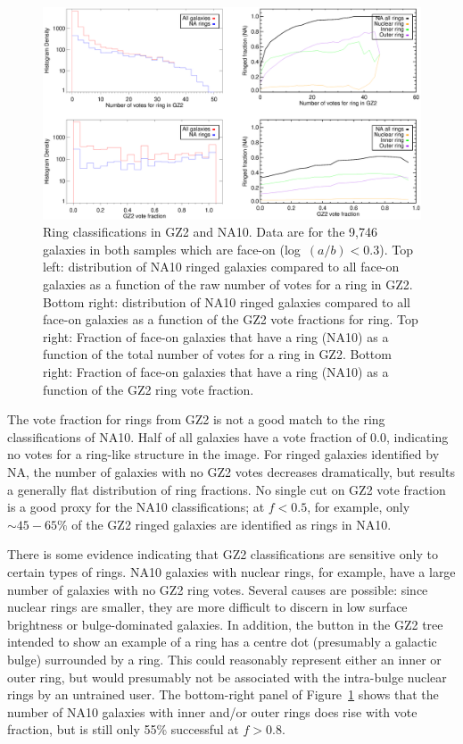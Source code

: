 \documentclass[useAMS,usenatbib]{mn2e}
\begin{document}
\begin{figure}
\includegraphics[angle=0,width=7.0in]{figures/na_rings_axial.eps}
\caption{Ring classifications in GZ2 and NA10. Data are for the 9,746 galaxies in both samples which are face-on (log~$(a/b)<0.3$). Top left: distribution of NA10 ringed galaxies compared to all face-on galaxies as a function of the raw number of votes for a ring in GZ2. Bottom right: distribution of NA10 ringed galaxies compared to all face-on galaxies as a function of the GZ2 vote fractions for ring. Top right: Fraction of face-on galaxies that have a ring (NA10) as a function of the total number of votes for a ring in GZ2. Bottom right: Fraction of face-on galaxies that have a ring (NA10) as a function of the GZ2 ring vote fraction. 
\label{fig-na_rings}}
\end{figure}

The vote fraction for rings from GZ2 is not a good match to the ring classifications of NA10. Half of all galaxies have a vote fraction of 0.0, indicating no votes for a ring-like structure in the image. For ringed galaxies identified by NA, the number of galaxies with no GZ2 votes decreases dramatically, but results a generally flat distribution of ring fractions. No single cut on GZ2 vote fraction is a good proxy for the NA10 classifications; at $f<0.5$, for example, only $\sim45-65\%$ of the GZ2 ringed galaxies are identified as rings in NA10.  

There is some evidence indicating that GZ2 classifications are sensitive only to certain types of rings. NA10 galaxies with nuclear rings, for example, have a large number of galaxies with no GZ2 ring votes. Several causes are possible: since nuclear rings are smaller, they are more difficult to discern in low surface brightness or bulge-dominated galaxies. In addition, the button in the GZ2 tree intended to show an example of a ring has a centre dot (presumably a galactic bulge) surrounded by a ring. This could reasonably represent either an inner or outer ring, but would presumably not be associated with the intra-bulge nuclear rings by an untrained user. The bottom-right panel of Figure~\ref{fig-na_rings} shows that the number of NA10 galaxies with inner and/or outer rings does rise with vote fraction, but is still only 55\% successful at $f > 0.8$. 
\end{document}
